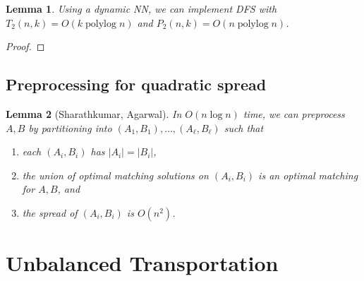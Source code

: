 \documentclass[11pt]{article}
\def\polylog{\mathop{\mathrm{polylog}}}
\theoremstyle{plain}
\newtheorem{lemma}{Lemma}[section]
\numberwithin{figure}{section}
\begin{document}
\begin{lemma}
\label{lemma:goldberg_dfs_time}
Using a dynamic NN, we can implement \textsc{DFS} with
$T_2(n, k) = O(k\polylog n)$ and $P_2(n, k) = O(n\polylog n)$.
\end{lemma}

\begin{proof}
\end{proof}








\subsection{Preprocessing for quadratic spread}

\begin{lemma}[Sharathkumar, Agarwal]
	In $O(n\log n)$ time, we can preprocess $A, B$ by partitioning into
	$(A_1, B_1), \ldots, (A_\ell, B_\ell)$ such that
	\begin{enumerate}
	\item each $(A_i, B_i)$ has $|A_i| = |B_i|$,
	\item the union of optimal matching solutions on $(A_i, B_i)$
		is an optimal matching for $A, B$, and
	\item the spread of $(A_i, B_i)$ is $O(n^2)$.
	\end{enumerate}
\end{lemma}






\section{Unbalanced Transportation}



{


}
\end{document}
